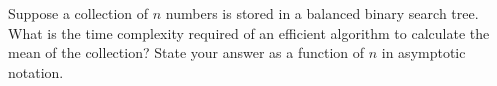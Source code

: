 
\begin{prob}
    Suppose a collection of $n$ numbers is stored in a balanced binary
    search tree. What is the time complexity required of an efficient algorithm
    to calculate the mean of the collection? State your answer as a function of
    $n$ in asymptotic notation.


\end{prob}
